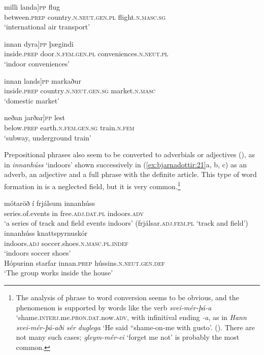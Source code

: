 \documentclass[output=paper]{LSP/langsci}
\begin{document}
\begin{xlist}
\ex
\gll {\ob}milli landa]\textsc{pp} flug\\
 between\textsc{.prep} country\textsc{.n.neut.gen.pl} flight\textsc{.n.masc.sg}\\
\glt ‘international air transport’

\ex
\gll {\ob}innan dyra]\textsc{pp}  þægindi  \\
 inside\textsc{.prep} door\textsc{.n.fem.gen.pl} conveniences\textsc{.n.neut.pl}\\
\glt ‘indoor conveniences’

\ex
\gll {\ob}innan lands]\textsc{pp} markaður  \\
 inside\textsc{.prep} country\textsc{.n.neut.gen.sg} market\textsc{.n.masc}\\
\glt ‘domestic market’

\ex
\gll {\ob}neðan jarðar]\textsc{pp} lest\\
 below\textsc{.prep} earth\textsc{.n.fem.gen.sg} train\textsc{.n.fem}\\
\glt ‘subway, underground train’
\z
\z

Prepositional phrases also seem to be converted to adverbials or adjectives (\citealt{Bjarnadóttir19962005}), as in \textit{innanhúss} ‘indoors’ shown successively in (\ref{ex:bjarnadottir:21}a, b, c) as an adverb, an adjective and a full  phrase with the definite article. This type of word formation in  is a neglected field, but it is very common.\footnote{The analysis of phrase to word conversion seems to be obvious, and the phenomenon is supported by words like the verb \textit{svei-mér-þá-a} `shame\textsc{.interj.}me\textsc{.pron.dat.}now\textsc{.adv}, with infinitival ending \textit{-a}, as in \textit{Hann svei-mér-þá-aði sér duglega} `He said ``shame-on-me{\textquotedbl} with gusto{\textquotedbl}'. (\citealt{Bjarnadóttir19962005}). There are not many such cases; \textit{gleym-mér-ei} `forget me not' is probably the most common.} 

\ea%
 \label{ex:bjarnadottir:21} 
 \ea \label{ex:bjarnadottir:21a} 
 \gll  mótaröð í frjálsum innanhúss\\
 series.of.events in free\textsc{.adj.dat.pl} indoors\textsc{.adv}\\
\glt ‘a series of track and field events indoors’
  (frjálsar\textsc{.adj.fem.pl} `track and field')\\

\ex \label{ex:bjarnadottir:21b} 
\gll innanhúss knattspyrnuskór \\
 indoors\textsc{.adj} soccer.shoes\textsc{.n.masc.pl.indef}\\
\glt `indoors soccer shoes'\\
\ex \label{ex:bjarnadottir:21c} 
  Hópurinn starfar innan.\textsc{prep} hússins\textsc{.n.neut.gen.def}\\
\glt ‘The group works inside the house’
\z
\z


\end{xlist}
\end{document}
